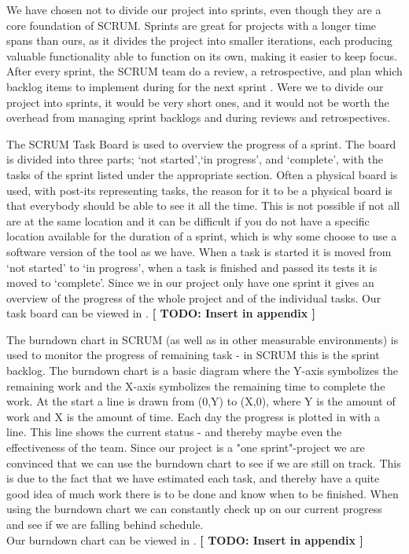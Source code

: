 We have chosen not to divide our project into sprints, even though they are a core foundation of SCRUM.
Sprints are great for projects with a longer time spans than ours, as it divides the project into smaller iterations, each producing valuable functionality able to function on its own, making it easier to keep focus.
After every sprint, the SCRUM team do a review, a retrospective, and plan which backlog items to implement during for the next sprint \cite[p. 8]{scrum-org-guide}.
Were we to divide our project into sprints, it would be very short ones, and it would not be worth the overhead from managing sprint backlogs and during reviews and retrospectives.

The SCRUM Task Board is used to overview the progress of a sprint. The board is divided into three parts; `not started',`in progress', and `complete', with the tasks of the sprint listed under the appropriate section. Often a physical board is used, with post-its representing tasks, the reason for it to be a physical board is that everybody should be able to see it all the time. This is not possible if not all are at the same location and it can be difficult if you do not have a specific location available for the duration of a sprint, which is why some choose to use a software version of the tool as we have. When a task is started it is moved from `not started' to `in progress', when a task is finished and passed its tests it is moved to `complete'. Since we in our project only have one sprint it gives an overview of the progress of the whole project and of the individual tasks.
Our task board can be viewed in . \textbf{[ TODO: Insert in appendix ]}

The burndown chart in SCRUM (as well as in other measurable environments) is used to monitor the progress of remaining task - in SCRUM this is the sprint backlog.
The burndown chart is a basic diagram where the Y-axis symbolizes the remaining work and the X-axis symbolizes the remaining time to complete the work.
At the start a line is drawn from (0,Y) to (X,0), where Y is the amount of work and X is the amount of time.
Each day the progress is plotted in with a line. This line shows the current status - and thereby maybe even the effectiveness of the team.
Since our project is a "one sprint"-project we are convinced that we can use the burndown chart to see if we are still on track. This is due to the fact that we have estimated each task, and thereby have a quite good idea of much work there is to be done and know when to be finished. When using the burndown chart we can constantly check up on our current progress and see if we are falling behind schedule.\\
Our burndown chart can be viewed in . \textbf{[ TODO: Insert in appendix ]}

